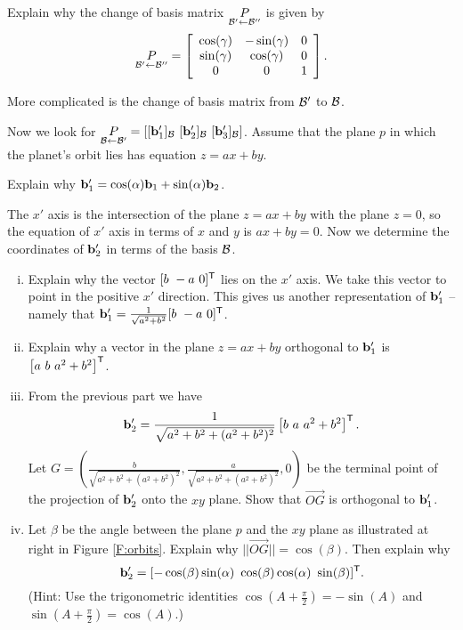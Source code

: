 \begin{pactivity} \label{act:orbits_COB_1} Explain why the change of basis matrix $\underset{\mathcal{B}' \leftarrow \mathcal{B}''}{P}$ is given by 
\[\underset{\mathcal{B}' \leftarrow \mathcal{B}''}{P} = \left[ \begin{array}{ccc} \cos(\gamma)&-\sin(\gamma)&0 \\ \sin(\gamma)&\cos(\gamma)&0 \\ 0&0&1 \end{array} \right].\]


\end{pactivity}

More complicated is the change of basis matrix from $\mathcal{B}'$ to $\mathcal{B}$. 

\begin{pactivity} \label{act:orbits_COB_2} Now we look for $\underset{\mathcal{B} \leftarrow \mathcal{B}'}{P} = [[\mathbf{b}'_1]_{\mathcal{B}} \ [\mathbf{b}'_2]_{\mathcal{B}} \ [\mathbf{b}'_3]_{\mathcal{B}}]$. Assume that the plane $p$ in which the planet's orbit lies has equation $z = ax+by$. 
\ba
\item Explain why $\mathbf{b}'_1 =  \cos(\alpha) \mathbf{b}_1 + \sin(\alpha) \mathbf{b}_2$. 

\item  The $x'$ axis is the intersection of the plane $z=ax+by$ with the plane $z=0$, so the equation of $x'$ axis in terms of $x$ and $y$ is $ax+by=0$. Now we determine the coordinates of $\mathbf{b}'_2$ in terms of the basis $\mathcal{B}$. 
	\begin{enumerate}[i.]
	\item Explain why the vector $[b \ -a \ 0]^{\tr}$ lies on the $x'$ axis. We take this vector to point in the positive $x'$ direction. This gives us another representation of $\mathbf{b}'_1$ -- namely that $\vb'_1 = \frac{1}{\sqrt{a^2+b^2}} [b \ -a \ 0]^{\tr}$. 

	\item Explain why a vector in the plane $z = ax+by$ orthogonal to $\mathbf{b}'_1$ is $\left[a \ b \ a^2+b^2 \right]^{\mathsf{T}}$.

	\item  From the previous part we have 
\[\mathbf{b}'_2 = \frac{1}{\sqrt{a^2+b^2+(a^2+b^2)^2}} \left[b \ a \ a^2+b^2 \right]^{\mathsf{T}}.\]
Let $G = \left(\frac{b}{\sqrt{a^2+b^2+(a^2+b^2)^2}}, \frac{a}{\sqrt{a^2+b^2+(a^2+b^2)^2}}, 0\right)$ be the terminal point of the projection of $\mathbf{b}'_2$ onto the $xy$ plane. Show that $\overrightarrow{OG}$ is orthogonal to $\mathbf{b}'_1$. 

	\item Let $\beta$ be the angle between the plane $p$ and the $xy$ plane as illustrated at right in Figure \ref{F:orbits}. Explain why $||\overrightarrow{OG}|| = \cos(\beta)$. Then explain why 
\[\vb'_2 = [ -\cos(\beta)\sin(\alpha) \ \cos(\beta)\cos(\alpha) \ \sin(\beta)]^{\tr}.\]
(Hint: Use the trigonometric identities $\cos\left(A+\frac{\pi}{2}\right) =  -\sin(A)$ and $\sin\left(A + \frac{\pi}{2}\right) =\cos(A)$.)


\end{enumerate}
\end{pactivity}
